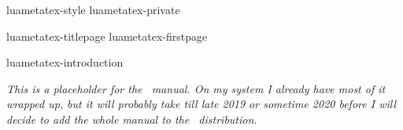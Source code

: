 
\environment luametatex-style
\environment luametatex-private

\startdocument
  [manual=LuaMeta\TeX,
   status=experimental,
   version=2.02]

\component luametatex-titlepage
\component luametatex-firstpage

\startfrontmatter
    \component luametatex-introduction
\stopfrontmatter

\startbodymatter

    \startparagraph \em
        This is a placeholder for the \LUAMETATEX\ manual. On my system I already
        have most of it wrapped up, but it will probably take till late 2019 or
        sometime 2020 before I will decide to add the whole manual to the
        \CONTEXT\ distribution.
    \stopparagraph


\stopbodymatter

\startbackmatter
\stopbackmatter

\stopdocument
